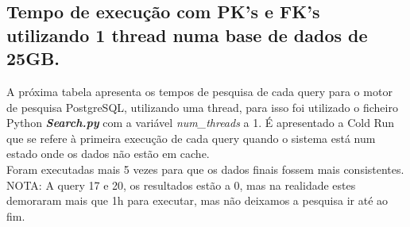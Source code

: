 \documentclass{article}
\begin{document}
  \clearpage

\subsection{Tempo de execução com PK's e FK's utilizando 1 thread numa base de dados de 25GB.}
\quad A próxima tabela apresenta os tempos de pesquisa de cada query para o motor de pesquisa PostgreSQL, utilizando uma thread, para isso foi utilizado o ficheiro Python \textbf{\textit{Search.py}}  com a variável \textit{num\_threads} a 1. 
\quad É apresentado a Cold Run que se refere à primeira execução de cada query quando o sistema está num estado onde os dados não estão em cache.\\
Foram executadas mais 5 vezes para que os dados finais fossem mais consistentes.\\
NOTA: A query 17 e 20, os resultados estão a 0, mas na realidade estes demoraram mais que 1h para executar, mas não deixamos a pesquisa ir até ao fim.
\end{document}
